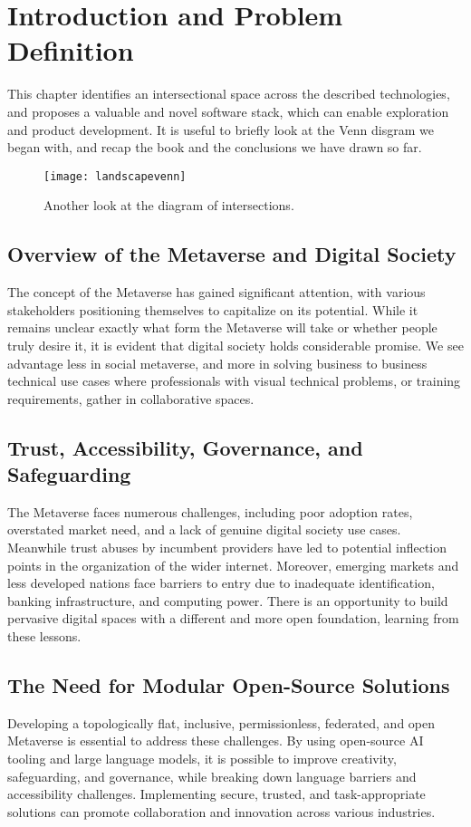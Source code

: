 \section{Introduction and Problem Definition}
This chapter identifies an intersectional space across the described technologies, and proposes a valuable and novel software stack, which can enable exploration  and product development. It is useful to briefly look at the Venn disgram we began with, and recap the book and the conclusions we have drawn so far.

\begin{figure*}[ht]\centering %
	\texttt{[image: landscapevenn]}
	\caption{Another look at the diagram of intersections.}
	\label{fig:landscapevenn}
\end{figure*}

\subsection{Overview of the Metaverse and Digital Society}
The concept of the Metaverse has gained significant attention, with various stakeholders positioning themselves to capitalize on its potential. While it remains unclear exactly what form the Metaverse will take or whether people truly desire it, it is evident that digital society holds considerable promise. We see advantage less in social metaverse, and more in solving business to business technical use cases where professionals with visual technical problems, or training requirements, gather in collaborative spaces.

\subsection{Trust, Accessibility, Governance, and Safeguarding}
The Metaverse faces numerous challenges, including poor adoption rates, overstated market need, and a lack of genuine digital society use cases. Meanwhile trust abuses by incumbent providers have led to potential inflection points in the organization of the wider internet. Moreover, emerging markets and less developed nations face barriers to entry due to inadequate identification, banking infrastructure, and computing power. There is an opportunity to build pervasive digital spaces with a different and more open foundation, learning from these lessons.

\subsection{The Need for Modular Open-Source Solutions}
Developing a topologically flat, inclusive, permissionless, federated, and open Metaverse is essential to address these challenges. By using open-source AI tooling and large language models, it is possible to improve creativity, safeguarding, and governance, while breaking down language barriers and accessibility challenges. Implementing secure, trusted, and task-appropriate solutions can promote collaboration and innovation across various industries.

